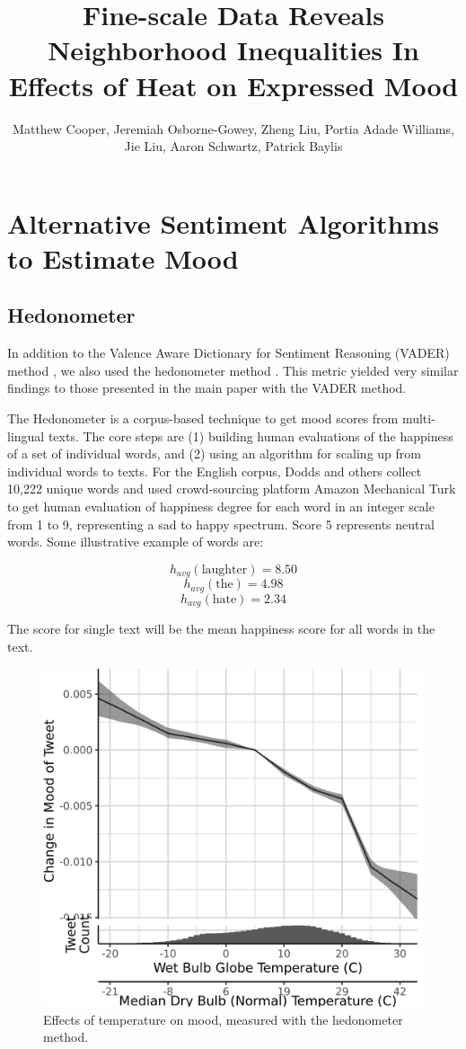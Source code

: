 \documentclass[9pt,twoside,lineno]{pnas-new}
\title{Fine-scale Data Reveals Neighborhood Inequalities In Effects of Heat on Expressed Mood}
\author{Matthew Cooper, Jeremiah Osborne-Gowey, Zheng Liu, Portia Adade Williams, Jie Liu, Aaron Schwartz, Patrick Baylis}
\begin{document}

\maketitle

\SItext

\section*{Alternative Sentiment Algorithms to Estimate Mood}

\subsection*{Hedonometer}

In addition to the Valence Aware Dictionary for Sentiment Reasoning (VADER) method \cite{gilbert_vader_2014}, we also used the hedonometer method \cite{Dodds2011Dec}.  This metric yielded very similar findings to those presented in the main paper with the VADER method.

The Hedonometer is a corpus-based technique to get mood scores from multi-lingual texts. The core steps are (1) building human evaluations of the happiness of a set of individual words, and (2) using an algorithm for scaling up from individual words to texts. For the English corpus, Dodds and others \cite{Dodds2011Dec} collect 10,222 unique words and used crowd-sourcing platform Amazon Mechanical Turk to get human evaluation of happiness degree for each word in an integer scale from 1 to 9, representing a sad to happy spectrum. Score 5 represents neutral words. Some illustrative example of words are: 

\[h_{avg} (\text{laughter}) = 8.50 \]
\[h_{avg} (\text{the}) = 4.98\]
\[h_{avg} (\text{hate}) = 2.34\]

The score for single text will be the mean happiness score for all words in the text.

\begin{figure}[H]
  \centering
  \includegraphics[width=0.6\linewidth]{../../../res/hedono-wbgt.png}
  \caption{Effects of temperature on mood, measured with the hedonometer method.}
\end{figure}
\end{document}
